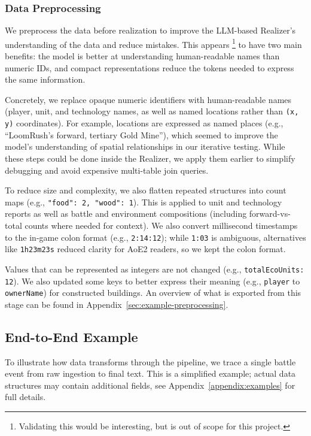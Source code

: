 \subsubsection{Data Preprocessing}
We preprocess the data before realization to improve the LLM-based Realizer's understanding of the data and reduce mistakes. This appears \footnote{Validating this would be interesting, but is out of scope for this project.} to have two main benefits: the model is better at understanding human-readable names than numeric IDs, and compact representations reduce the tokens needed to express the same information.

Concretely, we replace opaque numeric identifiers with human-readable names (player, unit, and technology names, as well as named locations rather than \texttt{(x, y)} coordinates). For example, locations are expressed as named places (e.g., ``LoomRush's forward, tertiary Gold Mine''), which seemed to improve the model's understanding of spatial relationships in our iterative testing. While these steps could be done inside the Realizer, we apply them earlier to simplify debugging and avoid expensive multi-table join queries.

To reduce size and complexity, we also flatten repeated structures into count maps (e.g., \texttt{"food": 2, "wood": 1}). This is applied to unit and technology reports as well as battle and environment compositions (including forward-vs-total counts where needed for context). We also convert millisecond timestamps to the in-game colon format (e.g., \texttt{2:14:12}); while \texttt{1:03} is ambiguous, alternatives like \texttt{1h23m23s} reduced clarity for AoE2 readers, so we kept the colon format.

Values that can be represented as integers are not changed (e.g., \texttt{totalEcoUnits: 12}). We also updated some keys to better express their meaning (e.g., \texttt{player} to \texttt{ownerName}) for constructed buildings. An overview of what is exported from this stage can be found in Appendix~\ref{sec:example-preprocessing}.

\subsection{End-to-End Example}
To illustrate how data transforms through the pipeline, we trace a single battle event from raw ingestion to final text. This is a simplified example; actual data structures may contain additional fields, see Appendix~\ref{appendix:examples} for full details.

